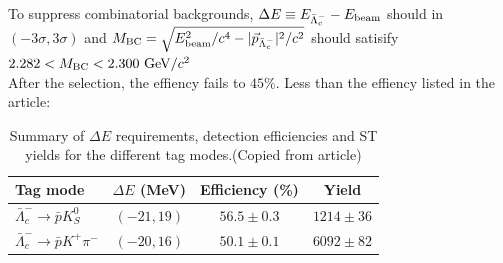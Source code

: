 \documentclass{beamer}
\begin{document}
\begin{frame}
    To suppress combinatorial backgrounds, $\Delta E \equiv E_{\bar{\Lambda}_c^-} -E_{\rm beam}$ should in $(-3\sigma,3\sigma)$ and $M_{\rm BC}=\sqrt{E_{\rm beam}^2/c^4-|\vec{p}_{\bar{\Lambda}_c^-}|^2/c^2}$ should satisify $2.282 <M_{\rm BC}<2.300~{\rm GeV}/c^2$\\
    \vspace{0.2in}
    After the selection, the effiency fails to $45\%$. Less than the effiency listed in the article:
    \begin{table}[ht]
        \centering
        \caption{ Summary of $\Delta E$  requirements, detection efficiencies and  ST yields for the different tag modes.(Copied from article)}
        \begin{tabular}{lccc}
            \hline
            \hline
            Tag {mode}                                        & $\Delta E$ (MeV) & Efficiency (\%) & Yield       \\
            \hline
            $\bar{\Lambda}_c^- \rightarrow \bar{p} K^0_S    $ & $(-21, 19)$      & $56.5\pm0.3$    & $1214\pm36$ \\
            $\bar{\Lambda}_c^- \rightarrow \bar{p} K^+ \pi^-$ & $(-20, 16)$      & $50.1\pm0.1$    & $6092\pm82$ \\
            \hline
            \hline
        \end{tabular}
        \label{table: summary of ST data}
    \end{table}
\end{frame}
\end{document}

